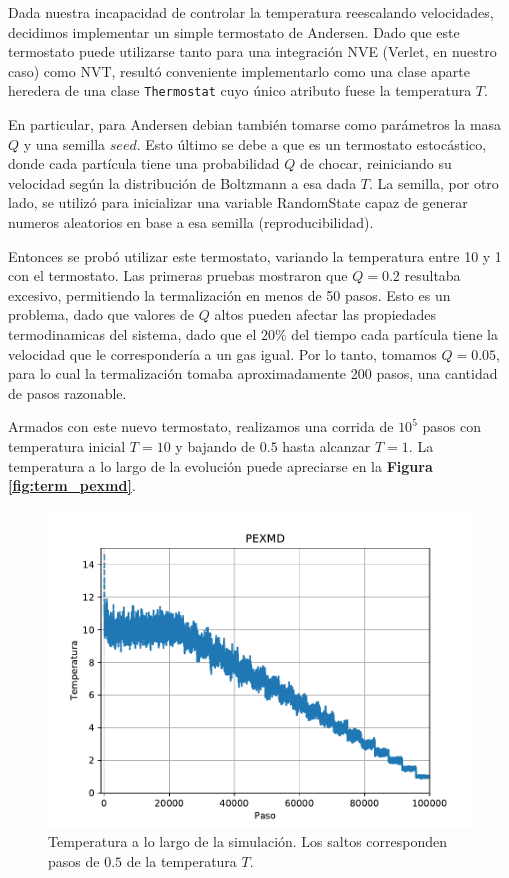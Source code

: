 \documentclass[twoside, 12pt]{article}
\begin{document}
Dada nuestra incapacidad de controlar la temperatura reescalando velocidades, decidimos implementar un simple termostato de Andersen.
Dado que este termostato puede utilizarse tanto para una integración NVE (Verlet, en nuestro caso) como NVT, resultó conveniente implementarlo como una clase aparte heredera de una clase \texttt{Thermostat} cuyo único
atributo fuese la temperatura $T$.

En particular, para Andersen debian también tomarse como parámetros la masa $Q$ y una semilla $seed$. 
Esto último se debe a que es un termostato estocástico, donde cada partícula tiene una probabilidad $Q$ de chocar, reiniciando su velocidad según la distribución de Boltzmann a esa dada $T$.
La semilla, por otro lado, se utilizó para inicializar una variable RandomState capaz de generar numeros aleatorios en base a esa semilla (reproducibilidad).

Entonces se probó utilizar este termostato, variando la temperatura entre 10 y 1 con el termostato. Las primeras pruebas mostraron que $Q=0.2$ resultaba excesivo, permitiendo la termalización en menos de 50 pasos. 
Esto es un problema, dado que valores de $Q$ altos pueden afectar las propiedades termodinamicas del sistema, dado que el $20\%$ del tiempo cada partícula tiene la velocidad que le correspondería a un gas igual.
Por lo tanto, tomamos $Q=0.05$, para lo cual la termalización tomaba aproximadamente 200 pasos, una cantidad de pasos razonable. 

Armados con este nuevo termostato, realizamos una corrida de $10^5$ pasos con temperatura inicial $T=10$ y bajando de $0.5$ hasta alcanzar $T=1$. 
La temperatura a lo largo de la evolución puede apreciarse en la \textbf{Figura \ref{fig:term_pexmd}}. 

\begin{figure}[h]
	\centering
	\includegraphics[width=0.5\columnwidth]{temp_pexmd.pdf}
	\caption{Temperatura a lo largo de la simulación. Los saltos corresponden pasos de $0.5$ de la temperatura $T$.}
	\label{fig:temp_pexmd}
\end{figure}
\end{document}
